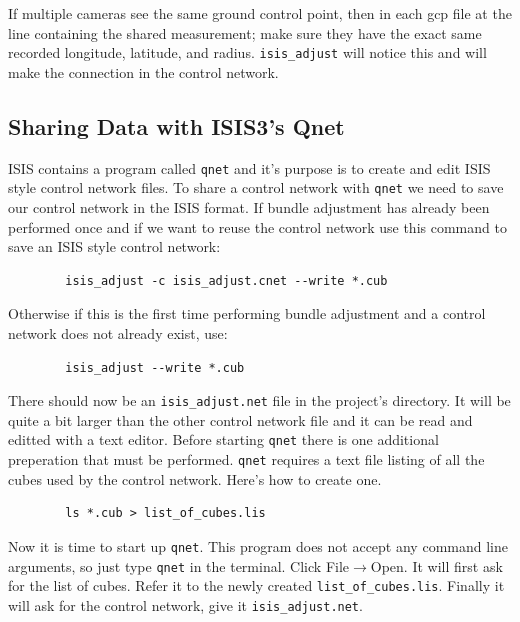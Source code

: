 If multiple cameras see the same ground control point, then in each
gcp file at the line containing the shared measurement; make sure they
have the exact same recorded longitude, latitude, and
radius. \texttt{isis\_adjust} will notice this and will make the
connection in the control network.

\subsection{Sharing Data with ISIS3's Qnet}

ISIS contains a program called \texttt{qnet} and it's purpose is to
create and edit ISIS style control network files. To share a control
network with \texttt{qnet} we need to save our control network in the
ISIS format. If bundle adjustment has already been performed once and
if we want to reuse the control network use this command to save an
ISIS style control network:

\begin{verbatim}
        isis_adjust -c isis_adjust.cnet --write *.cub
\end{verbatim}

Otherwise if this is the first time performing bundle adjustment and a
control network does not already exist, use:

\begin{verbatim}
        isis_adjust --write *.cub
\end{verbatim}

There should now be an \verb=isis_adjust.net= file in the project's
directory. It will be quite a bit larger than the other control
network file and it can be read and editted with a text editor. Before
starting \texttt{qnet} there is one additional preperation that must
be performed. \texttt{qnet} requires a text file listing of all the
cubes used by the control network. Here's how to create one.

\begin{verbatim}
        ls *.cub > list_of_cubes.lis
\end{verbatim}

Now it is time to start up \texttt{qnet}. This program does not accept
any command line arguments, so just type \texttt{qnet} in the
terminal. Click File$\rightarrow$Open. It will first ask for the list
of cubes. Refer it to the newly created
\verb=list_of_cubes.lis=. Finally it will ask for the control network,
give it \verb=isis_adjust.net=.

\begin{center}
\end{center}

